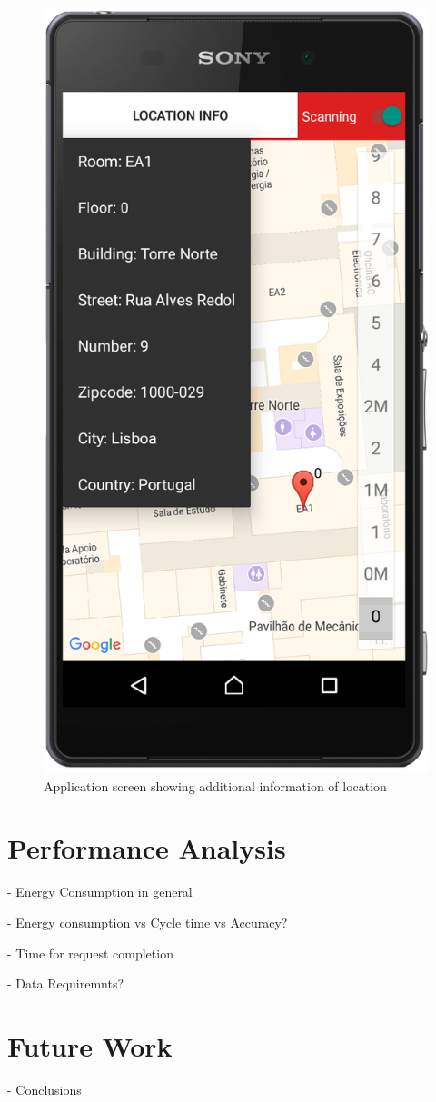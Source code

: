 \documentclass[a4paper]{IEEEtran}
\begin{document}
\begin{figure}
	\centering
		\includegraphics[width=0.5\linewidth]{figures/app_focused_menu.png}
	\caption[Application screen showing additional information of location]{Application screen showing additional information of location}
	\label{fig:AppMenu}
\end{figure}






\section{Performance Analysis}
\label{sec:performance}

- Energy Consumption in general

- Energy consumption vs Cycle time vs Accuracy?

- Time for request completion

- Data Requiremnts?
 



\section{Future Work}
\label{sec:future}

- Conclusions





\end{document}
